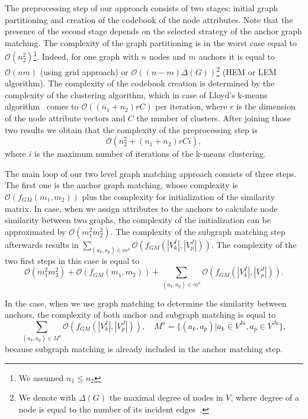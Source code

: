 The preprocessing step of our approach consists of two stages: initial graph partitioning and creation of the codebook of the node attributes. Note that the presence of the second stage depends on the selected strategy of the anchor graph matching. The complexity of the graph partitioning is in the worst case equal to $\mathcal{O}(n_2^2)$\footnote{We assumed $n_1\le n_2$}. Indeed, for one graph with $n$ nodes and $m$ anchors it is equal to $\mathcal{O}(nm)$ (using grid approach) or $\mathcal{O}((n-m)\Delta(G))$\footnote{We denote with $\Delta(G)$ the maximal degree of nodes in $V$, where degree of a node is equal to the number of its incident edges~\cite{Diestel2000}.} (HEM or LEM algorithm). The complexity of the codebook creation is determined by the complexity of the clustering algorithm, which in case of Lloyd's k-means algorithm~\cite{kmeans_LLoyd} comes to $\mathcal{O}((n_1+n_2)rC)$ per iteration, where $r$ is the dimension of the node attribute vectors and $C$ the number of clusters. After joining those two results we obtain that the complexity of the preprocessing step is
\begin{equation}\label{eq:complexity1}
\mathcal{O}(n_2^2+(n_1+n_2)rCi),
\end{equation}where $i$ is the maximum number of iterations of the k-means clustering.

The main loop of our two level graph matching approach consists of three steps. The first one is the anchor graph matching, whose complexity is $\mathcal{O}(f_{GM}(m_1,m_2))$ plus the complexity for initialization of the similarity matrix. In case, when we assign attributes to the anchors to calculate node similarity between two graphs, the complexity of the initialization can be approximated by $\mathcal{O}(m_1^2m_2^2)$. The complexity of the subgraph matching step afterwards results in $\sum_{(a_k,a_p)\in m^a}\mathcal{O}(f_{GM}(|V^I_k|,|V^J_p|))$. The complexity of the two first steps in this case is equal to
\begin{equation}\label{eq:complexity2}
\mathcal{O}(m_1^2m_2^2)+\mathcal{O}(f_{GM}(m_1,m_2))+\sum_{(a_k,a_p)\in m^a}\mathcal{O}(f_{GM}(|V^I_k|,|V^J_p|)).
\end{equation}

In the case, when we use graph matching to determine the similarity between anchors, the complexity of both anchor and subgraph matching is equal to 
\begin{equation}
\sum_{(a_k,a_p)\in M^a}\mathcal{O}(f_{GM}(|V^I_k|,|V^J_p|)),\quad M^a=\{(a_k,a_p)|a_k\in V^{Ia},a_p\in V^{Ja}\},
\end{equation}because subgraph matching is already included in the anchor matching step.

